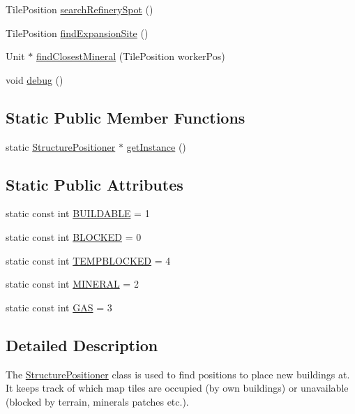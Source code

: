 \begin{DoxyCompactItemize}
\item 
Tile\-Position \hyperlink{class_structure_positioner_ac98af8b499f0875d3ac62d82d3046f08}{search\-Refinery\-Spot} ()
\item 
Tile\-Position \hyperlink{class_structure_positioner_a31cb4e031792bc10b23d2a6617dc0beb}{find\-Expansion\-Site} ()
\item 
Unit $\ast$ \hyperlink{class_structure_positioner_ac5278d8404365b6864c9dc5517d5c840}{find\-Closest\-Mineral} (Tile\-Position worker\-Pos)
\item 
void \hyperlink{class_structure_positioner_a93f082db7ea29452a3690e2694f0a2ca}{debug} ()
\end{DoxyCompactItemize}
\subsection*{Static Public Member Functions}
\begin{DoxyCompactItemize}
\item 
static \hyperlink{class_structure_positioner}{Structure\-Positioner} $\ast$ \hyperlink{class_structure_positioner_a736f73eee46a728f613d45be884bf674}{get\-Instance} ()
\end{DoxyCompactItemize}
\subsection*{Static Public Attributes}
\begin{DoxyCompactItemize}
\item 
static const int \hyperlink{class_structure_positioner_a52b8f5eec2db29464b7e7da910031cda}{B\-U\-I\-L\-D\-A\-B\-L\-E} = 1
\item 
static const int \hyperlink{class_structure_positioner_a808a58757b50522f54517ebe0f53f884}{B\-L\-O\-C\-K\-E\-D} = 0
\item 
static const int \hyperlink{class_structure_positioner_ad08ca89033039a7d467a5d2865328d84}{T\-E\-M\-P\-B\-L\-O\-C\-K\-E\-D} = 4
\item 
static const int \hyperlink{class_structure_positioner_a62fd11d736c0792adbe85ad1da4d9b48}{M\-I\-N\-E\-R\-A\-L} = 2
\item 
static const int \hyperlink{class_structure_positioner_aed20514df64d4a4ef64fa124b2709140}{G\-A\-S} = 3
\end{DoxyCompactItemize}


\subsection{Detailed Description}
The \hyperlink{class_structure_positioner}{Structure\-Positioner} class is used to find positions to place new buildings at. It keeps track of which map tiles are occupied (by own buildings) or unavailable (blocked by terrain, minerals patches etc.).

